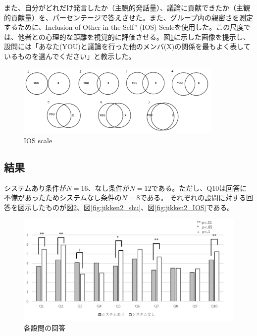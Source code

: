 \documentclass[11pt, a4paper]{jreport} %
\begin{document}
また、自分がどれだけ発言したか（主観的発話量）、議論に貢献できたか（主観的貢献量）を、パーセンテージで答えさせた。また、グループ内の親密さを測定するために、Inclusion of Other in the Self” (IOS) Scale\cite{aron1992inclusion}を使用した。この尺度では、他者との心理的な距離を視覚的に評価させる。図\ref{fig:IOS}に示した画像を提示し、設問には「あなた(YOU)と議論を行った他のメンバ(X)の関係を最もよく表しているものを選んでください」と教示した。

\begin{figure}[htbp]
\begin{center}
\includegraphics[width=100mm]{images/IOS}
\caption{IOS scale}
\label{fig:IOS}
\end{center}
\end{figure}

\subsection{結果}
システムあり条件が$N=16$、なし条件が$N=12$である。ただし、Q10は回答に不備があったためシステムなし条件の$N=8$である。
それぞれの設問に対する回答を図示したものが図\ref{fig:jikken2_kobetu}、図\ref{fig:jikken2_shu}、図\ref{fig:jikken2_IOS}である。

\begin{figure}[htbp]
\begin{center}
\includegraphics[width=150mm]{images/jikken2_kobetu}
\caption{各設問の回答}
\label{fig:jikken2_kobetu}
\end{center}
\end{figure}
\end{document}
